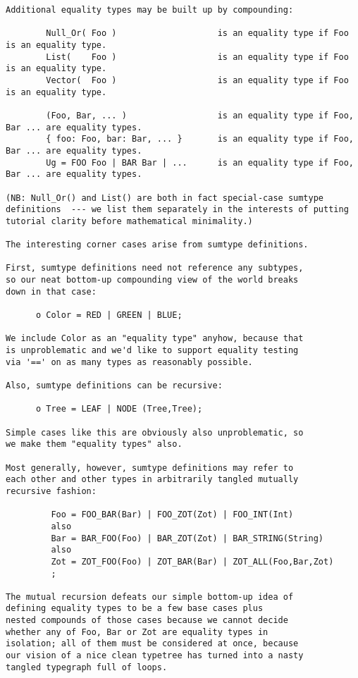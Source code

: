\begin{verbatim}
Additional equality types may be built up by compounding:  
 
        Null_Or( Foo )                    is an equality type if Foo is an equality type.   
        List(    Foo )                    is an equality type if Foo is an equality type.   
        Vector(  Foo )                    is an equality type if Foo is an equality type.  
 
        (Foo, Bar, ... )                  is an equality type if Foo, Bar ... are equality types.  
        { foo: Foo, bar: Bar, ... }       is an equality type if Foo, Bar ... are equality types.  
        Ug = FOO Foo | BAR Bar | ...      is an equality type if Foo, Bar ... are equality types.  
     
(NB: Null_Or() and List() are both in fact special-case sumtype 
definitions  --- we list them separately in the interests of putting 
tutorial clarity before mathematical minimality.) 

The interesting corner cases arise from sumtype definitions. 

First, sumtype definitions need not reference any subtypes, 
so our neat bottom-up compounding view of the world breaks 
down in that case: 

      o Color = RED | GREEN | BLUE; 

We include Color as an "equality type" anyhow, because that 
is unproblematic and we'd like to support equality testing 
via '==' on as many types as reasonably possible. 

Also, sumtype definitions can be recursive: 

      o Tree = LEAF | NODE (Tree,Tree); 

Simple cases like this are obviously also unproblematic, so 
we make them "equality types" also. 

Most generally, however, sumtype definitions may refer to 
each other and other types in arbitrarily tangled mutually 
recursive fashion: 

         Foo = FOO_BAR(Bar) | FOO_ZOT(Zot) | FOO_INT(Int) 
         also 
         Bar = BAR_FOO(Foo) | BAR_ZOT(Zot) | BAR_STRING(String) 
         also 
         Zot = ZOT_FOO(Foo) | ZOT_BAR(Bar) | ZOT_ALL(Foo,Bar,Zot) 
         ; 

The mutual recursion defeats our simple bottom-up idea of 
defining equality types to be a few base cases plus 
nested compounds of those cases because we cannot decide 
whether any of Foo, Bar or Zot are equality types in 
isolation; all of them must be considered at once, because 
our vision of a nice clean typetree has turned into a nasty 
tangled typegraph full of loops. 


\end{verbatim}
